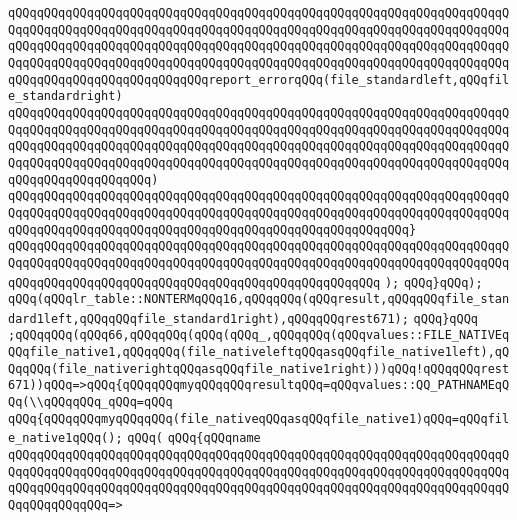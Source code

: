 \verb|qQQqqQQqqQQqqQQqqQQqqQQqqQQqqQQqqQQqqQQqqQQqqQQqqQQqqQQqqQQqqQQqqQQqqQQqqQQqqQQqqQQqqQQqqQQqqQQqqQQqqQQqqQQqqQQqqQQqqQQqqQQqqQQqqQQqqQQqqQQqqQQqqQQqqQQqqQQqqQQqqQQqqQQqqQQqqQQqqQQqqQQqqQQqqQQqqQQqqQQqqQQqqQQqqQQqqQQqqQQqqQQqqQQqqQQqqQQqqQQqqQQqqQQqqQQqqQQqqQQqqQQqqQQqqQQqqQQqqQQqqQQqqQQqqQQqqQQqqQQqqQQqqQQqreport_errorqQQq(file_standardleft,qQQqfile_standardright)|\newline
\verb|qQQqqQQqqQQqqQQqqQQqqQQqqQQqqQQqqQQqqQQqqQQqqQQqqQQqqQQqqQQqqQQqqQQqqQQqqQQqqQQqqQQqqQQqqQQqqQQqqQQqqQQqqQQqqQQqqQQqqQQqqQQqqQQqqQQqqQQqqQQqqQQqqQQqqQQqqQQqqQQqqQQqqQQqqQQqqQQqqQQqqQQqqQQqqQQqqQQqqQQqqQQqqQQqqQQqqQQqqQQqqQQqqQQqqQQqqQQqqQQqqQQqqQQqqQQqqQQqqQQqqQQqqQQqqQQqqQQqqQQqqQQqqQQqqQQqqQQqqQQq)|\newline
\verb|qQQqqQQqqQQqqQQqqQQqqQQqqQQqqQQqqQQqqQQqqQQqqQQqqQQqqQQqqQQqqQQqqQQqqQQqqQQqqQQqqQQqqQQqqQQqqQQqqQQqqQQqqQQqqQQqqQQqqQQqqQQqqQQqqQQqqQQqqQQqqQQqqQQqqQQqqQQqqQQqqQQqqQQqqQQqqQQqqQQqqQQqqQQqqQQqqQQq}|\newline
\verb|qQQqqQQqqQQqqQQqqQQqqQQqqQQqqQQqqQQqqQQqqQQqqQQqqQQqqQQqqQQqqQQqqQQqqQQqqQQqqQQqqQQqqQQqqQQqqQQqqQQqqQQqqQQqqQQqqQQqqQQqqQQqqQQqqQQqqQQqqQQqqQQqqQQqqQQqqQQqqQQqqQQqqQQqqQQqqQQqqQQqqQQqqQQqqQQq|\newline
\verb|);|\newline
\verb|qQQq}qQQq);|\newline
\verb|qQQq(qQQqlr_table::NONTERMqQQq16,qQQqqQQq(qQQqresult,qQQqqQQqfile_standard1left,qQQqqQQqfile_standard1right),qQQqqQQqrest671);|\newline
\verb|qQQq}qQQq|\newline
\verb|;qQQqqQQq(qQQq66,qQQqqQQq(qQQq(qQQq_,qQQqqQQq(qQQqvalues::FILE_NATIVEqQQqfile_native1,qQQqqQQq(file_nativeleftqQQqasqQQqfile_native1left),qQQqqQQq(file_nativerightqQQqasqQQqfile_native1right)))qQQq!qQQqqQQqrest671))qQQq=>qQQq{qQQqqQQqmyqQQqqQQqresultqQQq=qQQqvalues::QQ_PATHNAMEqQQq(\\qQQqqQQq_qQQq=qQQq|\newline
\verb|qQQq{qQQqqQQqmyqQQqqQQq(file_nativeqQQqasqQQqfile_native1)qQQq=qQQqfile_native1qQQq();|\newline
\verb|qQQq(|\newline
\verb|qQQq{qQQqname|\newline
\verb|qQQqqQQqqQQqqQQqqQQqqQQqqQQqqQQqqQQqqQQqqQQqqQQqqQQqqQQqqQQqqQQqqQQqqQQqqQQqqQQqqQQqqQQqqQQqqQQqqQQqqQQqqQQqqQQqqQQqqQQqqQQqqQQqqQQqqQQqqQQqqQQqqQQqqQQqqQQqqQQqqQQqqQQqqQQqqQQqqQQqqQQqqQQqqQQqqQQqqQQqqQQqqQQqqQQqqQQqqQQqqQQq=>|\newline

